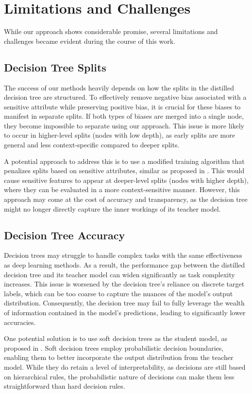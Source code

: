 \section{Limitations and Challenges}
\label{sec:limitations}
While our approach shows considerable promise,
several limitations and challenges became evident during the course of this work. 

\subsection*{Decision Tree Splits}
The success of our methods heavily depends on how the splits in the distilled decision tree are structured.  
To effectively remove negative bias associated with a sensitive attribute while preserving positive bias,  
it is crucial for these biases to manifest in separate splits.  
If both types of biases are merged into a single node, they become impossible to separate using our approach.  
This issue is more likely to occur in higher-level splits (nodes with low depth),  
as early splits are more general and less context-specific compared to deeper splits.  

A potential approach to address this is to use a modified training algorithm that penalizes splits based on sensitive attributes,  
similar as proposed in \cite{fairness_decision_tree}.  
This would cause sensitive features to appear at deeper-level splits (nodes with higher depth),
where they can be evaluated in a more context-sensitive manner. 
However, this approach may come at the cost of accuracy and transparency,  
as the decision tree might no longer directly capture the inner workings of its teacher model.

\subsection*{Decision Tree Accuracy}
Decision trees may struggle to handle complex tasks with the same effectiveness as deep learning methods.  
As a result, the performance gap between the distilled decision tree and its teacher model
can widen significantly as task complexity increases.
This issue is worsened by the decision tree's reliance on discrete target labels, 
which can be too coarse to capture the nuances of the model's output distribution.
Consequently, the decision tree may fail to fully leverage the wealth of information contained in the model's predictions,
leading to significantly lower accuracies.

One potential solution is to use soft decision trees as the student model, 
as proposed in \cite{soft_decision_tree}.
Soft decision trees employ probabilistic decision boundaries, 
enabling them to better incorporate the output distribution from the teacher model. 
While they do retain a level of interpretability, as decisions are still based on hierarchical rules,
the probabilistic nature of decisions can make them less straightforward than hard decision rules.

